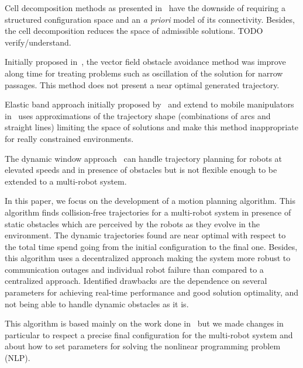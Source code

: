 \documentclass[eprint]{actapoly}
\begin{document}
 

Cell decomposition methods as presented in~\cite{Latombe1991} have the 
downside of requiring a structured configuration space and an \textit{a priori} 
model of its connectivity. Besides, the cell decomposition reduces the space 
of admissible solutions. TODO verify/understand.

 

Initially proposed in~\cite{Khatib1986}, the vector field obstacle avoidance 
method was improve along time for treating problems such as oscillation of the 
solution for narrow passages. This method does not present a near optimal 
generated trajectory.

 

Elastic band approach initially proposed by~\cite{Quinlan1994} and extend to 
mobile manipulators in~\cite{Brock et Khatib, 1998} uses approximations of the 
trajectory shape (combinations of arcs and straight lines) limiting the space 
of solutions and make this method inappropriate for really constrained 
environments.

 

The dynamic window approach~\cite{Fox1997} can handle trajectory 
planning for robots at elevated speeds and in presence of obstacles but is not 
flexible enough to be extended to a multi-robot system.

 


In this paper, we focus on the development of a motion planning algorithm. 
This algorithm finds collision-free trajectories for a multi-robot system in 
presence of static obstacles which are perceived by the robots as they evolve 
in the environment. The dynamic trajectories found are near optimal with 
respect to the total time spend going from the initial configuration to the 
final one. Besides, this algorithm uses a decentralized approach making the 
system more robust to communication outages and individual robot failure than 
compared to a centralized approach. Identified drawbacks are the dependence on 
several parameters for achieving real-time performance and good solution 
optimality, and not being able to handle dynamic obstacles as it is.

 

This algorithm is based mainly on the work done in~\cite{Defoort2007a} but we 
made changes in particular to respect a precise final configuration for the 
multi-robot system and about how to set parameters for solving the nonlinear 
programming problem (NLP).
\end{document}
